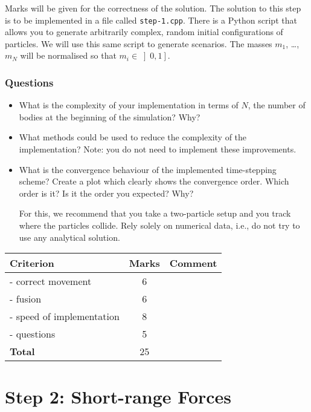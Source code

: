 \documentclass[11pt,a4paper,DIV=12,pdftex]{scrartcl}
\begin{document}
Marks will be given for the correctness of the solution. The solution to this step is to be implemented in a file called \verb=step-1.cpp=.
There is a Python script that allows you to generate arbitrarily complex, random initial configurations of particles. We will use this same script to generate scenarios. The masses $m_1$, \dots, $m_N$ will be normalised so that $m_i \in \left]0, 1\right]$.

\subsubsection*{Questions}
\begin{itemize}
 \item What is the complexity of your implementation in terms of $N$, the number of bodies at the beginning of the simulation? Why?
 \item What methods could be used to reduce the complexity of the implementation? Note: you do not need to implement these improvements.
 \item What is the convergence behaviour of the implemented time-stepping scheme? Create a plot which clearly shows the convergence order. Which order is it? Is it the order you expected? Why?

For this, we recommend that you take a two-particle setup and you track where the particles collide. Rely solely on numerical data, i.e., do not try to use any analytical solution.
\end{itemize}



\begin{table}[h]
\centering
 \begin{tabular}{|l|c|p{7cm}|}
 \hline
 \textbf{Criterion} & \textbf{Marks} &\textbf{Comment}\\
\hline
- correct movement &  6 & \\
- fusion & 6 & \\
- speed of implementation & 8 & \\
- questions & 5 &\\
    \hline
\textbf{Total} & 25 & \\
 \hline
 \end{tabular}
\end{table}

\section*{Step 2: Short-range Forces}
\end{document}
